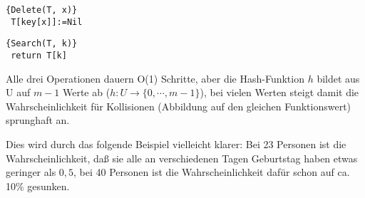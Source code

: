 \begin{Algorithmus}[H]
\begin{lstlisting}[frame=tlrb, mathescape=true, title=\textsc{Delete\textnormal{(T, x)}},gobble=1]{Delete(T, x)}
 T[key[x]]:=Nil
\end{lstlisting}
\end{Algorithmus}

\begin{Algorithmus}[H]
\begin{lstlisting}[frame=tlrb, mathescape=true, title=\textsc{Search\textnormal{(T, k)}},gobble=1]{Search(T, k)}
 return T[k]
\end{lstlisting}
\end{Algorithmus} 

Alle drei Operationen dauern O(1) Schritte, aber
die Hash-Funktion $h$ bildet aus U auf $m-1$ Werte ab ($h: U \rightarrow \{0, \cdots, m-1\}$), bei vielen Werten steigt
damit die Wahrscheinlichkeit für Kollisionen (Abbildung auf den gleichen Funktionswert) sprung\-haft an. 

Dies wird durch das folgende Beispiel vielleicht klarer: Bei 23 Personen
ist die Wahr\-scheinlichkeit, daß sie alle an verschiedenen Tagen Geburtstag haben etwas geringer als $0,5$, bei 40
Personen ist die Wahrscheinlichkeit dafür schon auf ca. 10\% gesunken.

